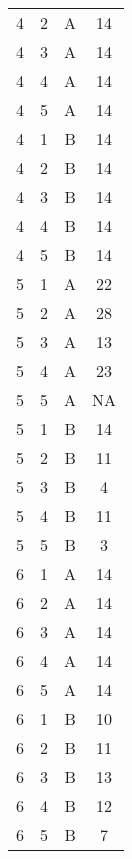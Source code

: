 \documentclass[12pt]{article}
\begin{document}
\begin{table}[ht]
\begin{tabular}{cccc}
    4 &   2 & A &  14 \\ 
    4 &   3 & A &  14 \\ 
    4 &   4 & A &  14 \\ 
    4 &   5 & A &  14 \\ 
    4 &   1 & B &  14 \\ 
    4 &   2 & B &  14 \\ 
    4 &   3 & B &  14 \\ 
    4 &   4 & B &  14 \\ 
    4 &   5 & B &  14 \\ 
    5 &   1 & A &  22 \\ 
    5 &   2 & A &  28 \\ 
    5 &   3 & A &  13 \\ 
    5 &   4 & A &  23 \\ 
    5 &   5 & A & NA \\ 
    5 &   1 & B &  14 \\ 
    5 &   2 & B &  11 \\ 
    5 &   3 & B &   4 \\ 
    5 &   4 & B &  11 \\ 
    5 &   5 & B &   3 \\ 
    6 &   1 & A &  14 \\ 
    6 &   2 & A &  14 \\ 
    6 &   3 & A &  14 \\ 
    6 &   4 & A &  14 \\ 
    6 &   5 & A &  14 \\ 
    6 &   1 & B &  10 \\ 
    6 &   2 & B &  11 \\ 
    6 &   3 & B &  13 \\ 
    6 &   4 & B &  12 \\ 
    6 &   5 & B &   7 \\ 
   \hline
\end{tabular}
\end{table}
 
\end{document}
